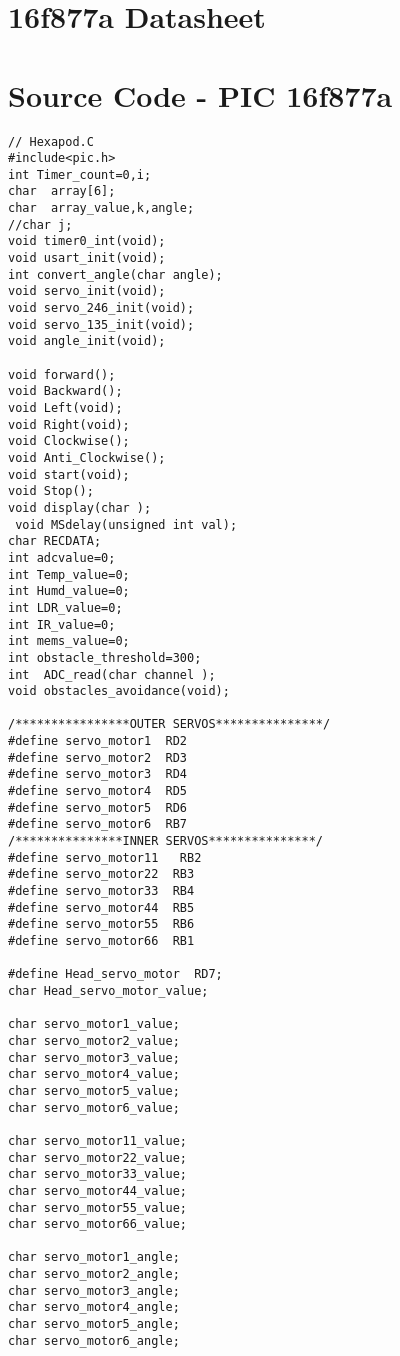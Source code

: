 \documentclass{report}
\begin{document}
\begin{appendices}

\chapter{16f877a Datasheet}


\chapter{Source Code - PIC 16f877a}

\begin{lstlisting}
// Hexapod.C
#include<pic.h>
int Timer_count=0,i;
char  array[6];
char  array_value,k,angle;
//char j;
void timer0_int(void);
void usart_init(void);
int convert_angle(char angle);
void servo_init(void);
void servo_246_init(void);
void servo_135_init(void);
void angle_init(void);

void forward();
void Backward();
void Left(void);
void Right(void);
void Clockwise();
void Anti_Clockwise();
void start(void);
void Stop();
void display(char );
 void MSdelay(unsigned int val);
char RECDATA;
int adcvalue=0;
int Temp_value=0;
int Humd_value=0;
int LDR_value=0;
int IR_value=0;
int mems_value=0;
int obstacle_threshold=300;
int  ADC_read(char channel );
void obstacles_avoidance(void);

/****************OUTER SERVOS***************/
#define servo_motor1  RD2
#define servo_motor2  RD3
#define servo_motor3  RD4
#define servo_motor4  RD5
#define servo_motor5  RD6
#define servo_motor6  RB7
/***************INNER SERVOS***************/
#define servo_motor11   RB2
#define servo_motor22  RB3
#define servo_motor33  RB4
#define servo_motor44  RB5
#define servo_motor55  RB6
#define servo_motor66  RB1

#define Head_servo_motor  RD7;
char Head_servo_motor_value;

char servo_motor1_value;
char servo_motor2_value;
char servo_motor3_value;
char servo_motor4_value;
char servo_motor5_value;
char servo_motor6_value;

char servo_motor11_value;
char servo_motor22_value;
char servo_motor33_value;
char servo_motor44_value;
char servo_motor55_value;
char servo_motor66_value;

char servo_motor1_angle;
char servo_motor2_angle;
char servo_motor3_angle;
char servo_motor4_angle;
char servo_motor5_angle;
char servo_motor6_angle;


\end{lstlisting}
\end{appendices}
\end{document}
